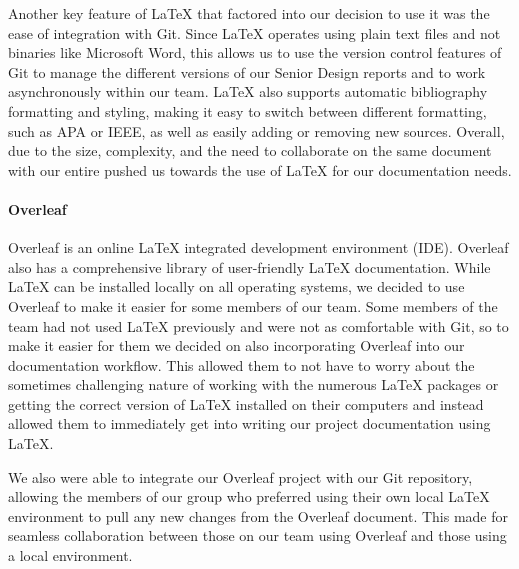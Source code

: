 Another key feature of LaTeX that factored into our decision to use it was the ease of integration with Git. Since LaTeX operates using plain text files and not binaries like Microsoft Word, this allows us to use the version control features of Git to manage the different versions of our Senior Design reports and to work asynchronously within our team. LaTeX also supports automatic bibliography formatting and styling, making it easy to switch between different formatting, such as APA or IEEE, as well as easily adding or removing new sources. Overall, due to the size, complexity, and the need to collaborate on the same document with our entire pushed us towards the use of LaTeX for our documentation needs.

\paragraph{Overleaf}
Overleaf is an online LaTeX integrated development environment (IDE). Overleaf also has a comprehensive library of user-friendly LaTeX documentation. While LaTeX can be installed locally on all operating systems, we decided to use Overleaf to make it easier for some members of our team. Some members of the team had not used LaTeX previously and were not as comfortable with Git, so to make it easier for them we decided on also incorporating Overleaf into our documentation workflow. This allowed them to not have to worry about the sometimes challenging nature of working with the numerous LaTeX packages or getting the correct version of LaTeX installed on their computers and instead allowed them to immediately get into writing our project documentation using LaTeX.

We also were able to integrate our Overleaf project with our Git repository, allowing the members of our group who preferred using their own local LaTeX environment to pull any new changes from the Overleaf document. This made for seamless collaboration between those on our team using Overleaf and those using a local environment.


